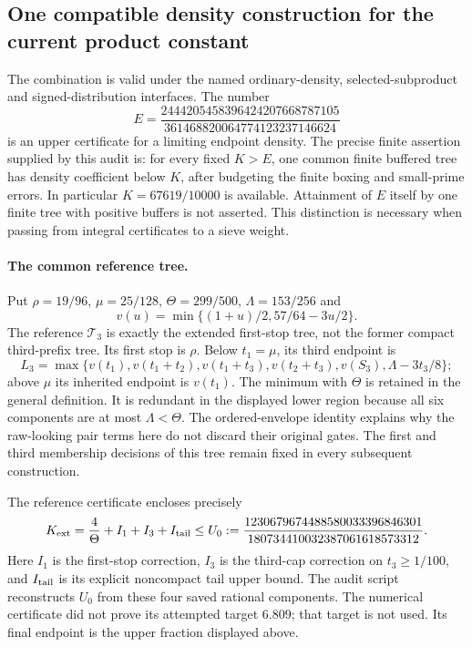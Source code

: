 \subsection{One compatible density construction for the current product constant}
\label{sec:actual-k-density-joint-audit}

The combination is valid under the named ordinary-density,
selected-subproduct and signed-distribution interfaces. The number
\[
 E=\frac{2444205458396424207668787105}
         {361468820064774123237146624}
\]
is an upper certificate for a limiting endpoint density. The precise
finite assertion supplied by this audit is: for every fixed $K>E$,
one common finite buffered tree has density coefficient below $K$,
after budgeting the finite boxing and small-prime errors. In particular
$K=67619/10000$ is available. Attainment of $E$ itself by one finite
tree with positive buffers is not asserted. This distinction is
necessary when passing from integral certificates to a sieve weight.

\paragraph{The common reference tree.}
Put $\rho=19/96$, $\mu=25/128$, $\Theta=299/500$,
$\Lambda=153/256$ and
\[
 v(u)=\min\{(1+u)/2,57/64-3u/2\}.
\]
The reference $\mathcal T_3$ is exactly the extended first-stop tree,
not the former compact third-prefix tree. Its first stop is $\rho$.
Below $t_1=\mu$, its third endpoint is
\[
 L_3=\max\{v(t_1),v(t_1+t_2),v(t_1+t_3),v(t_2+t_3),
                  v(S_3),\Lambda-3t_3/8\};
\]
above $\mu$ its inherited endpoint is $v(t_1)$. The minimum with
$\Theta$ is retained in the general definition. It is redundant in
the displayed lower region because all six components are at most
$\Lambda<\Theta$. The ordered-envelope identity explains why the
raw-looking pair terms here do not discard their original gates.
The first and third membership decisions of this tree remain fixed
in every subsequent construction.

The reference certificate encloses precisely
\[
 K_{\rm ext}=\frac4\Theta+I_1+I_3+I_{\rm tail}
 \le U_0:=\frac{1230679674488580033396846301}
                 {180734410032387061618573312}.
\]
Here $I_1$ is the first-stop correction, $I_3$ is the third-cap
correction on $t_3\ge1/100$, and $I_{\rm tail}$ is its explicit
noncompact tail upper bound. The audit script reconstructs $U_0$
from these four saved rational components. The numerical certificate
did not prove its attempted target $6.809$; that target is not used.
Its final endpoint is the upper fraction displayed above.

